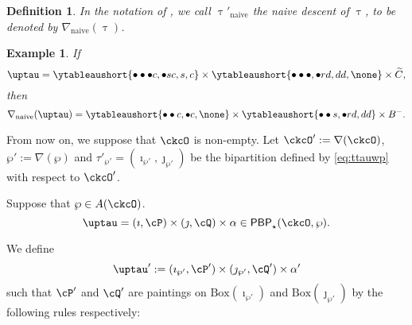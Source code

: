 \documentclass[12pt,a4paper]{amsart}
\let\ytb=\ytableaushort
\newcommand{\CO}{{\mathcal {O}}}
\def\DD{\nabla}
\numberwithin{equation}{section}
\newtheorem{defn}[thm]{Definition}
\newtheorem{eg}[thm]{Example}
\theoremstyle{remark}
\def\DD{\nabla}
\def\BOX#1{\mathrm{Box}(#1)}
\def\PBP{\mathsf{PBP}}
\def\PBPop#1#2#3#4{\PBP_{#1}^{#2}(#3,#4)}
\newcommand{\PBPOP}[1][]{\PBPop{\star}{#1}{\ckcO}{\wp}}
\def\tnaive{\mathrm{naive}}
\def\imathwpp{\imath_{\wp'}}
\def\jmathwpp{\jmath_{\wp'}}
\def\tauwpp{\tau'_{\wp'}}
\def\uptaupn{\uptau'_{\tnaive}}
\def\DD{\nabla}
\def\DDn{\nabla_{\tnaive}}
\begin{document}
\begin{defn}
 In the notation of , we call $\uptaupn$ the naive descent of $\uptau$, to be denoted by $\DDn(\uptau)$.
\end{defn}




 \begin{eg} If
    \[
     \uptau = \ytb{\bullet\bullet\bullet {c},\bullet {s} {c},{s},{c}}
    \times \ytb{\bullet\bullet\bullet ,\bullet {r} {d},{d}{d}, \none}
    \times \widetilde C, \]
   then
   \[
    \nabla_{\mathrm{naive}}(\uptau) =\ytb{\bullet\bullet{c} ,\bullet{c},\none }
    \times  \ytb{\bullet\bullet {s} ,\bullet {r} {d},{d}{d}}\times B^-.
    \]

\end{eg}


From now on, we suppose that $\ckcO$ is non-empty.
Let $\ckcO' := \DD(\ckcO)$, $\wp':=\DD(\wp)$ and $\tauwpp = (\imathwpp,\jmathwpp)$ be the
bipartition defined by \eqref{eq:ttauwp} with respect to $\ckcO'$.

Suppose that $\wp\in A(\ckcO)$.
\[
\uptau=(\imath,\cP)\times(\jmath,\cQ)\times \alpha \in  \PBPOP.
\]


We define
\[
  \uptau' := (\imathwpp, \cP')\times (\jmathwpp, \cQ')\times \alpha'
\]
such that $\cP'$ and $\cQ'$ are paintings on $\BOX{\imath_{\wp'}}$ and
$\BOX{\jmath_{\wp'}}$  %
by the following rules  respectively:



\end{document}
